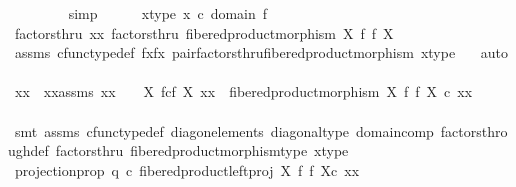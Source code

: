 \begin{isabellebody}
\ \ \ \ \ \ \ \isamarkupfalse%
\ simp\isanewline
\ \ \ \ \isamarkupfalse%
\ x{\isacharunderscore}{\kern0pt}type{\isacharcolon}{\kern0pt}\ {\isachardoublequoteopen}x\ {\isasymin}\isactrlsub c\ domain\ f{\isachardoublequoteclose}\isanewline
\ \ \ \ \isamarkupfalse%
\ factorsthru{\isacharcolon}{\kern0pt}\ {\isachardoublequoteopen}{\isasymlangle}x{\isacharcomma}{\kern0pt}x{\isasymrangle}\ factorsthru\ fibered{\isacharunderscore}{\kern0pt}product{\isacharunderscore}{\kern0pt}morphism\ X\ f\ f\ X{\isachardoublequoteclose}\isanewline
\ \ \ \ \ \ \isamarkupfalse%
\ assms{\isacharparenleft}{\kern0pt}{}{\isacharparenright}{\kern0pt}\ cfunc{\isacharunderscore}{\kern0pt}type{\isacharunderscore}{\kern0pt}def\ fxfx\ pair{\isacharunderscore}{\kern0pt}factorsthru{\isacharunderscore}{\kern0pt}fibered{\isacharunderscore}{\kern0pt}product{\isacharunderscore}{\kern0pt}morphism\ x{\isacharunderscore}{\kern0pt}type\ \ \isamarkupfalse%
\ auto\isanewline
\ \ \ \ \isamarkupfalse%
\ \isamarkupfalse%
\ xx\ \ xx{\isacharunderscore}{\kern0pt}assms{\isacharcolon}{\kern0pt}\ {\isachardoublequoteopen}xx\ {\isacharcolon}{\kern0pt}\ {\isasymone}\ {\isasymrightarrow}\ X\ \isactrlbsub f\isactrlesub {\isasymtimes}\isactrlsub c\isactrlbsub f\isactrlesub \ X{\isachardoublequoteclose}\ {\isachardoublequoteopen}{\isasymlangle}x{\isacharcomma}{\kern0pt}x{\isasymrangle}\ {\isacharequal}{\kern0pt}\ fibered{\isacharunderscore}{\kern0pt}product{\isacharunderscore}{\kern0pt}morphism\ X\ f\ f\ X\ {\isasymcirc}\isactrlsub c\ xx{\isachardoublequoteclose}\isanewline
\ \ \ \ \ \ \isamarkupfalse%
\ {\isacharparenleft}{\kern0pt}smt\ assms{\isacharparenleft}{\kern0pt}{}{\isacharparenright}{\kern0pt}\ cfunc{\isacharunderscore}{\kern0pt}type{\isacharunderscore}{\kern0pt}def\ diag{\isacharunderscore}{\kern0pt}on{\isacharunderscore}{\kern0pt}elements\ diagonal{\isacharunderscore}{\kern0pt}type\ domain{\isacharunderscore}{\kern0pt}comp\ factors{\isacharunderscore}{\kern0pt}through{\isacharunderscore}{\kern0pt}def\ factorsthru\ fibered{\isacharunderscore}{\kern0pt}product{\isacharunderscore}{\kern0pt}morphism{\isacharunderscore}{\kern0pt}type\ x{\isacharunderscore}{\kern0pt}type{\isacharparenright}{\kern0pt}\isanewline
\ \ \ \ \ \ \isanewline
\ \ \ \ \isamarkupfalse%
\ projection{\isacharunderscore}{\kern0pt}prop{\isacharcolon}{\kern0pt}\ {\isachardoublequoteopen}q{}\ {\isasymcirc}\isactrlsub c\ {\isacharparenleft}{\kern0pt}{\isacharparenleft}{\kern0pt}fibered{\isacharunderscore}{\kern0pt}product{\isacharunderscore}{\kern0pt}left{\isacharunderscore}{\kern0pt}proj\ X\ f\ f\ X{\isacharparenright}{\kern0pt}{\isasymcirc}\isactrlsub c\ xx{\isacharparenright}{\kern0pt}\ {\isacharequal}{\kern0pt}\ \isanewline

\end{isabellebody}

